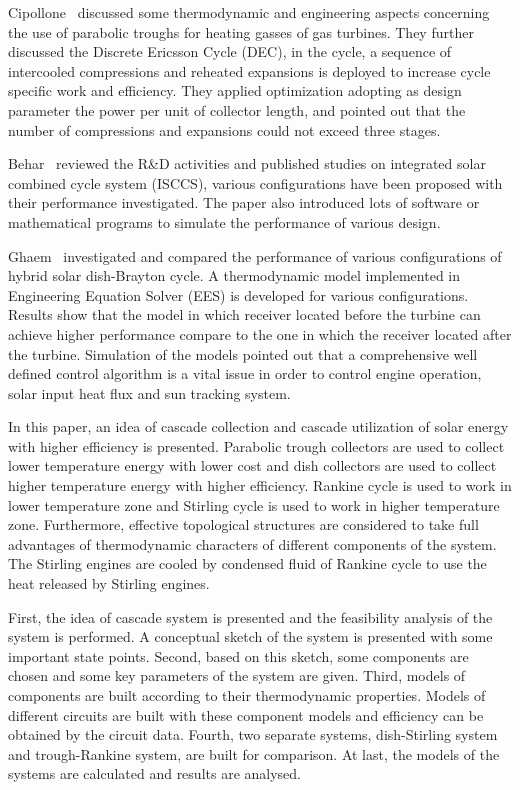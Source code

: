 \documentclass{article}
\begin{document}
Cipollone~\cite{Cipollone2014} discussed some thermodynamic and engineering aspects concerning the use of parabolic troughs for heating gasses of gas turbines. They further discussed the Discrete Ericsson Cycle (DEC), in the cycle, a sequence of intercooled compressions and reheated expansions is deployed to increase cycle specific work and efficiency. They applied optimization adopting as design parameter the power per unit of collector length, and pointed out that the number of compressions and expansions could not exceed three stages.

Behar~\cite{Behar2014} reviewed the R\&D activities and published studies on integrated solar combined cycle system (ISCCS), various configurations have been proposed with their performance investigated. The paper also introduced lots of software or mathematical programs to simulate the performance of various design.

Ghaem~\cite{Ghaem2012} investigated and compared the performance of various configurations of hybrid solar dish-Brayton cycle. A thermodynamic model implemented in Engineering Equation Solver (EES) is developed for various configurations. Results show that the model in which receiver located before the turbine can achieve higher performance compare to the one in which the receiver located after the turbine. Simulation of the models pointed out that a comprehensive well defined control algorithm is a vital issue in order to control engine operation, solar input heat flux and sun tracking system.

In this paper, an idea of cascade collection and cascade utilization of solar energy with higher efficiency is presented. Parabolic trough collectors are used to collect lower temperature energy with lower cost and dish collectors are used to collect higher temperature energy with higher efficiency. Rankine cycle is used to work in lower temperature zone and Stirling cycle is used to work in higher temperature zone. Furthermore, effective topological structures are considered to take full advantages of thermodynamic characters of different components of the system. The Stirling engines are cooled by condensed fluid of Rankine cycle to use the heat released by Stirling engines. 

First, the idea of cascade system is presented and the feasibility analysis of the system is performed. A conceptual sketch of the system is presented with some important state points. Second, based on this sketch, some components are chosen and some key parameters of the system are given. Third, models of components are built according to their thermodynamic properties. Models of different circuits are built with these component models and efficiency can be obtained by the circuit data. Fourth, two separate systems, dish-Stirling system and trough-Rankine system, are built for comparison. At last, the models of the systems are calculated and results are analysed.
\end{document}
